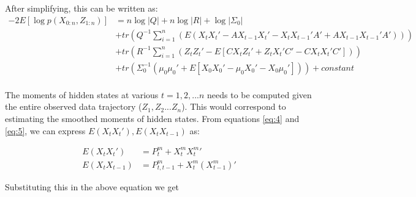 \documentclass{article}
\begin{document}
After simplifying, this can be written as: 
\begin{equation}
\begin{split}
     -2E[\log p(X_{0:n},Z_{1:n})] &=n\log |Q|+n\log|R| + \log|\Sigma_0|\\
     &+ tr(Q^{-1}\sum_{i=1}^n(E(X_tX_t' - AX_{t-1}X_t'-X_tX_{t-1}'A'+AX_{t-1}X_{t-1}'A'))) \\ 
 &+ tr(R^{-1}\sum_{i=1}^n(Z_tZ_t'-E[CX_tZ_t'+Z_tX_t'C'-CX_tX_t'C']))\\
 &+ tr(\Sigma_0^{-1}(\mu_0\mu_0'+E[X_0X_0'-\mu_0X_0'-X_0\mu_0'])) +constant\\
\end{split}
\end{equation}

The moments of hidden states at various $t=1,2,...n$ needs to be computed given the entire observed data trajectory ($Z_1,Z_2...Z_n$). This would correspond to estimating the smoothed moments of hidden states.  From equations \ref{eq:4} and \ref{eq:5}, we can express $E(X_tX_t'), E(X_tX_{t-1})$ as:

\begin{equation}
    \begin{split}
        E(X_tX_t')&=P_t^m+X_t^m{X_t^{m}}'\\
        E(X_tX_{t-1})&=P_{t,t-1}^m+X_t^m(X_{t-1}^m)'
    \end{split}
\end{equation}


Substituting this in the above equation we get
\end{document}
